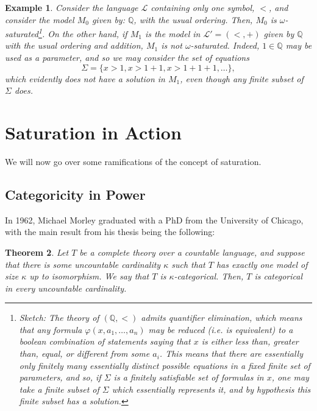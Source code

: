 \documentclass{article}
\newtheorem{theorem}{Theorem}[section]
\newtheorem{example}[theorem]{Example}
\theoremstyle{nonumberplain}
\newcommand{\Q}{\mathbb{Q}}
\newcommand{\Lang}{\mathcal{L}}
\begin{document}
\begin{example}
Consider the language $\Lang$ containing only one symbol, $<$, and consider the model $M_0$ given by: $\Q$, with the usual ordering. Then, $M_0$ is $\omega$-saturated\footnote{Sketch: The theory of $(\Q,<)$ admits quantifier elimination, which means that any formula $\varphi(x,a_1, \dots, a_n)$ may be reduced (i.e. is equivalent) to a boolean combination of statements saying that $x$ is either less than, greater than, equal, or different from some $a_i$. This means that there are essentially only finitely many essentially distinct possible equations in a fixed finite set of parameters, and so, if $\Sigma$ is a finitely satisfiable set of formulas in $x$, one may take a finite subset of $\Sigma$ which essentially represents it, and by hypothesis this finite subset has a solution.}. On the other hand, if $M_1$ is the model in $\Lang' = (<,+)$ given by $\Q$ with the usual ordering and addition, $M_1$ is not $\omega$-saturated. Indeed, $1 \in \Q$ may be used as a parameter, and so we may consider the set of equations
\begin{equation}
\Sigma = \{ x > 1, x > 1+1, x>1+1+1, \dots \},
\end{equation}
which evidently does not have a solution in $M_1$, even though any finite subset of $\Sigma$ does.
\end{example}

\section{Saturation in Action}

We will now go over some ramifications of the concept of saturation.

\subsection{Categoricity in Power}

In 1962, Michael Morley graduated with a PhD from the University of Chicago, with the main result from his thesis \cite{morley} being the following:
\begin{theorem}\label{thm:morley}
Let $T$ be a complete theory over a countable language, and suppose that there is some uncountable cardinality $\kappa$ such that $T$ has \emph{exactly} one model of size $\kappa$ up to isomorphism. We say that $T$ is \emph{$\kappa$-categorical}. Then, $T$ is categorical in every uncountable cardinality.
\end{theorem}
\end{document}
